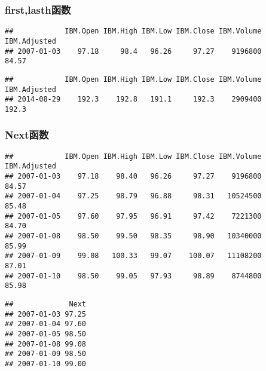 \subsubsection{first,lasth函数}
\begin{knitrout}
\color{fgcolor}\begin{kframe}
\begin{alltt}
\end{alltt}
\begin{verbatim}
##            IBM.Open IBM.High IBM.Low IBM.Close IBM.Volume IBM.Adjusted
## 2007-01-03    97.18     98.4   96.26     97.27    9196800        84.57
\end{verbatim}
\begin{alltt}
\end{alltt}
\begin{verbatim}
##            IBM.Open IBM.High IBM.Low IBM.Close IBM.Volume IBM.Adjusted
## 2014-08-29    192.3    192.8   191.1     192.3    2909400        192.3
\end{verbatim}
\end{kframe}
\end{knitrout}
\subsubsection{Next函数}
\begin{knitrout}
\color{fgcolor}\begin{kframe}
\begin{alltt}
\end{alltt}
\begin{verbatim}
##            IBM.Open IBM.High IBM.Low IBM.Close IBM.Volume IBM.Adjusted
## 2007-01-03    97.18    98.40   96.26     97.27    9196800        84.57
## 2007-01-04    97.25    98.79   96.88     98.31   10524500        85.48
## 2007-01-05    97.60    97.95   96.91     97.42    7221300        84.70
## 2007-01-08    98.50    99.50   98.35     98.90   10340000        85.99
## 2007-01-09    99.08   100.33   99.07    100.07   11108200        87.01
## 2007-01-10    98.50    99.05   97.93     98.89    8744800        85.98
\end{verbatim}
\begin{alltt}
\hlstd{(}\hlstd{))}
\end{alltt}
\begin{verbatim}
##             Next
## 2007-01-03 97.25
## 2007-01-04 97.60
## 2007-01-05 98.50
## 2007-01-08 99.08
## 2007-01-09 98.50
## 2007-01-10 99.00
\end{verbatim}
\end{kframe}
\end{knitrout}
